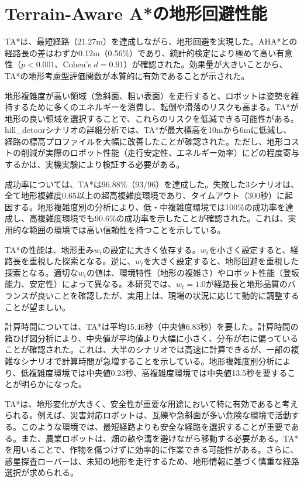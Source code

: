 \section{Terrain-Aware A*の地形回避性能}

TA*は、最短経路（21.27m）を達成しながら、地形回避を実現した。AHA*との経路長の差はわずか0.12m（0.56\%）であり、統計的検定により極めて高い有意性（$p<0.001$、Cohen's $d=0.91$）が確認された。効果量が大きいことから、TA*の地形考慮型評価関数が本質的に有効であることが示された。

地形複雑度が高い領域（急斜面、粗い表面）を走行すると、ロボットは姿勢を維持するために多くのエネルギーを消費し、転倒や滑落のリスクも高まる。TA*が地形の良い領域を選択することで、これらのリスクを低減できる可能性がある。hill\_detourシナリオの詳細分析では、TA*が最大標高を10mから6mに低減し、経路の標高プロファイルを大幅に改善したことが確認された。ただし、地形コストの削減が実際のロボット性能（走行安定性、エネルギー効率）にどの程度寄与するかは、実機実験により検証する必要がある。

成功率については、TA*は96.88\%（93/96）を達成した。失敗した3シナリオは、全て地形複雑度0.65以上の超高複雑度環境であり、タイムアウト（300秒）に起因する。地形複雑度別の分析により、低・中複雑度環境では100\%の成功率を達成し、高複雑度環境でも90.6\%の成功率を示したことが確認された。これは、実用的な範囲の環境では高い信頼性を持つことを示している。

TA*の性能は、地形重み$w_t$の設定に大きく依存する。$w_t$を小さく設定すると、経路長を重視した探索となる。逆に、$w_t$を大きく設定すると、地形回避を重視した探索となる。適切な$w_t$の値は、環境特性（地形の複雑さ）やロボット性能（登坂能力、安定性）によって異なる。本研究では、$w_t = 1.0$が経路長と地形品質のバランスが良いことを確認したが、実用上は、現場の状況に応じて動的に調整することが望ましい。

計算時間については、TA*は平均15.46秒（中央値6.83秒）を要した。計算時間の箱ひげ図分析により、中央値が平均値より大幅に小さく、分布が右に偏っていることが確認された。これは、大半のシナリオでは高速に計算できるが、一部の複雑なシナリオで計算時間が急増することを示している。地形複雑度別分析により、低複雑度環境では中央値0.23秒、高複雑度環境では中央値13.5秒を要することが明らかになった。

TA*は、地形変化が大きく、安全性が重要な用途において特に有効であると考えられる。例えば、災害対応ロボットは、瓦礫や急斜面が多い危険な環境で活動する。このような環境では、最短経路よりも安全な経路を選択することが重要である。また、農業ロボットは、畑の畝や溝を避けながら移動する必要がある。TA*を用いることで、作物を傷つけずに効率的に作業できる可能性がある。さらに、惑星探査ローバーは、未知の地形を走行するため、地形情報に基づく慎重な経路選択が求められる。

